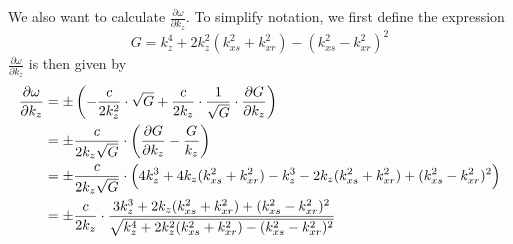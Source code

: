 \documentclass{article}%
\begin{document}
We also want to calculate $\frac{\partial \omega}{\partial k_z}$. To simplify notation, we first define the expression
\begin{equation}
	G = k_z^4 + 2k_z^2(k_{xs}^2 + k_{xr}^2) - (k_{xs}^2-k_{xr}^2)^2
\label{eq:}
\end{equation}
$\frac{\partial \omega}{\partial k_z}$ is then given by
\begin{align}
	\frac{\partial \omega}{\partial k_z} &= \pm \left(-\frac{c}{2k_z^2} \cdot \sqrt{G} 
		+ \frac{c}{2k_z} \cdot \frac{1}{\sqrt{G}} \cdot \frac{\partial G}{\partial k_z} \right) \\
		&= \pm\frac{c}{2k_z\sqrt{G}} \cdot \left(\frac{\partial G}{\partial k_z} -\frac{G}{k_z}\right)\\
		&= \pm \frac{c}{2k_z\sqrt{G}} \cdot \Bigl(4k_z^3 + 4k_z(k_{xs}^2 + k_{xr}^2)
			- k_z^3 - 2 k_z(k_{xs}^2 + k_{xr}^2) + (k_{xs}^2-k_{xr}^2)^2 \Bigr) \\
		&= \pm \frac{c}{2k_z} \cdot \frac{3k_z^3 + 2k_z(k_{xs}^2 + k_{xr}^2) + (k_{xs}^2-k_{xr}^2)^2}
			{\sqrt{k_z^4 + 2k_z^2(k_{xs}^2 + k_{xr}^2) - (k_{xs}^2-k_{xr}^2)^2}} \\		
\label{eq:}
\end{align}
\end{document}
